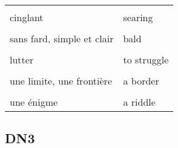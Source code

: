 \documentclass[
  10pt,
]{article}
\begin{document}
\begin{longtable}{ll}
\cellcolor{gray!6}{supporter, accepter} & \cellcolor{gray!6}{to bear}\\

cinglant & searing\\

\cellcolor{gray!6}{une hypothèse} & \cellcolor{gray!6}{an assumption}\\

sans fard, simple et clair & bald\\

\cellcolor{gray!6}{une tentative} & \cellcolor{gray!6}{an endeavour}\\

lutter & to struggle\\

\cellcolor{gray!6}{vaincre} & \cellcolor{gray!6}{to overcome}\\

une limite, une frontière & a border\\

\cellcolor{gray!6}{superficiel, peu profond} & \cellcolor{gray!6}{shallow}\\

une énigme & a riddle\\
\bottomrule
\end{longtable}

\hypertarget{dn3}{%
\subsection{DN3}\label{dn3}}
\end{document}
